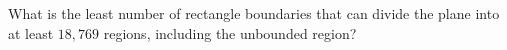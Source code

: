 What is the least number of rectangle boundaries that can divide the plane into at least $18{,}769$ regions, including the unbounded region?
